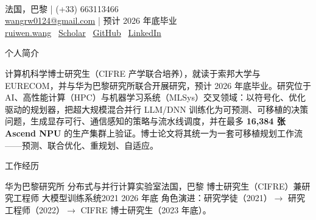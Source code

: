 \documentclass[a4paper,11pt]{article}
\renewcommand{\cvsection}[1]{%
  \par\vspace{6pt}%
  {\heiti\fontsize{13pt}{14pt}\selectfont\color{Accent}#1}\par
  \vspace{2pt}{\color{RuleColor}\hrule height 0.6pt}\vspace{4pt}%
}
\begin{document}
\begin{minipage}[t]{0.60\textwidth}
  \;\\[3pt]
\end{minipage}
\hfill
\begin{minipage}[t]{0.40\textwidth}
  \raggedleft\footnotesize\color{TextMuted}
  法国，巴黎 \;|\; (+33) 663113466\\
  \href{mailto:wangrw0124@gmail.com}{wangrw0124@gmail.com} \;|\; 预计 2026 年底毕业\\
  \href{http://ruiwen.wang/}{ruiwen.wang} \textperiodcentered\ \href{https://scholar.google.com/citations?user=AR1nHEUAAAAJ}{Scholar} \textperiodcentered\ \href{https://github.com/wang-ruiwen}{GitHub} \textperiodcentered\ \href{https://www.linkedin.com/in/ruiwen-wang-ai/}{LinkedIn}
\end{minipage}

\vspace{5pt}
\AccentRule

\cvsection{个人简介}
\small
计算机科学博士研究生（CIFRE 产学联合培养），就读于索邦大学与 EURECOM，并与华为巴黎研究所联合开展研究，预计 2026 年底毕业。研究位于 AI、高性能计算（HPC）与机器学习系统（MLSys）交叉领域：以符号化、优化驱动的规划器，把超大规模混合并行 LLM/DNN 训练化为可预测、可移植的决策问题，生成显存可行、通信感知的策略与流水线调度，并在最多 \textbf{16,384 张 Ascend NPU} 的生产集群上验证。博士论文将其统一为一套可移植规划工作流——预测、联合优化、重规划、自适应。

\cvsection{工作经历}
\cventry
  {华为巴黎研究所 \textemdash{} 分布式与并行计算实验室}{法国，巴黎}
  {博士研究生（CIFRE）兼研究工程师 \textemdash{} 大模型训练系统}{2021 \textemdash{} 2026 年底}
\itemListStart
\itemListEnd
{\footnotesize\color{TextMuted}角色演进：研究学徒（2021）$\rightarrow$ 研究工程师（2022）$\rightarrow$ CIFRE 博士研究生（2023 年底）。}
\end{document}

